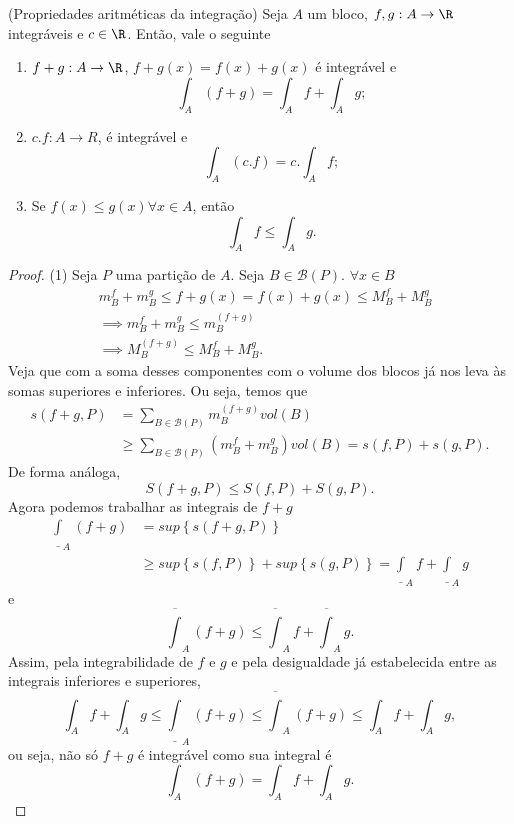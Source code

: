 \begin{theorem}
    (Propriedades aritméticas da integração) Seja $A$ um bloco, $f, g: A\to \R$ integráveis e $c\in \R$. Então, vale o seguinte
    \begin{enumerate}
	\item $f+g:A\to \R$, $f+g(x) = f(x) + g(x)$ é integrável e \[
	\int_A \left( f+g \right) = \int_A f + \int_A g
	;\] 
	\item $c.f: A \to R$, é integrável e  \[
	\int_A \left( c.f \right) = c. \int_A f
	;\] 
	\item Se $f(x) \le g(x) \forall x \in A$, então \[
	\int_A f \le \int_A g
	.\] 
    \end{enumerate}
\end{theorem}
\begin{proof}
    (1) Seja $P$ uma partição de $A$. Seja $B\in \mathcal{B}\left( P \right) $. $\forall  x\in B$
    \begin{align*}
	& m_B^{f} + m_B^{g} \le  f+g \left( x \right) =f(x) + g(x) \le M_B^{f} + M_B^{g}\\
	&\implies m_B^{f} + m_B^{g} \le m_B^{(f+g)} \\
	&\implies M_B^{(f+g)}\le M_B^{f} + M_B^{g}
    .\end{align*}
    Veja que com a soma desses componentes com o volume dos blocos já nos leva às somas superiores e inferiores. Ou seja, temos que
    \begin{align*}
	s\left( f+g, P \right) &= \sum_{B\in \mathcal{B}\left( P \right)} m_B^{(f+g)} vol\left( B \right) \\ 
			       &\ge \sum_{B\in \mathcal{B}\left( P \right)} \left( m_B^{f}+m_B^{g} \right) vol\left( B \right) = s\left( f, P \right) + s\left( g, P \right) 
    .\end{align*}
    De forma análoga, \[
    S\left( f+g,P \right) \le S\left( f,P \right) +S\left( g,P \right) 
    .\]
    Agora podemos trabalhar as integrais de $f+g$
    \begin{align*}
	\underline{\int}_A \left( f+g \right)  &= sup \left\{ s\left( f+g,P \right)  \right\} \\
			       &\ge sup \left\{ s\left( f,P \right)  \right\} + sup \left\{ s\left( g,P \right)  \right\} = \underline{\int}_A f + \underline{\int}_A g
    \end{align*}
    e \[
	\overline{\int}_A \left( f+g \right) \le  \overline{\int}_A f + \overline{\int}_A g
    .\] Assim, pela integrabilidade de $f$ e $g$ e pela desigualdade já estabelecida entre as integrais inferiores e superiores, \[
    \int_A f + \int_A g \le \underline{\int}_A \left( f+g \right) \le \overline{\int}_A \left( f+g \right) \le \int_A f + \int_A g
    ,\] ou seja, não só $f+g$ é integrável como sua integral é \[
    \int_A \left( f+g \right) = \int_A f + \int_A g
    .\] 


\end{proof}
